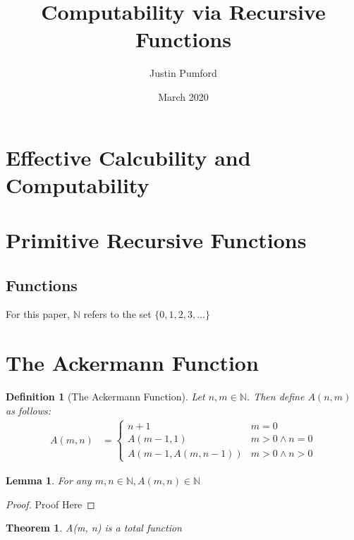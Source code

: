 \documentclass[12pt, letterpaper]{article}
\title{Computability via Recursive Functions}
\author{Justin Pumford  }
\date{March 2020}
\newtheorem{theorem}{Theorem}
\newtheorem{lemma}{Lemma}
\newtheorem*{definition}{Definition}
\begin{document}
  \maketitle

  \section{Effective Calcubility and Computability}

  \section{Primitive Recursive Functions}
    \subsection{Functions}
      For this paper, $\mathbb{N}$ refers to the set $\{0, 1, 2, 3, ...\}$

  \section{The Ackermann Function}
    \begin{definition}[The Ackermann Function]
      Let $n, m \in \mathbb{N}$. Then define $A(n, m)$ as follows:
      \begin{equation*}
        \begin{aligned}
          A(m, n) &=
          \begin{cases}
            n + 1                   & m = 0 \\
            A(m - 1, 1)             & m > 0 \wedge n = 0 \\
            A(m - 1, A(m, n - 1))   & m > 0 \wedge n > 0
          \end{cases}
        \end{aligned}
      \end{equation*}
    \end{definition}

    \begin{lemma}
      \label{inn}
      For any $m, n \in \mathbb{N}, A(m, n) \in \mathbb{N}$
    \end{lemma}
    \begin{proof}
      Proof Here
    \end{proof}

    \begin{theorem}
      A(m, n) is a total function
    \end{theorem}
\end{document}
